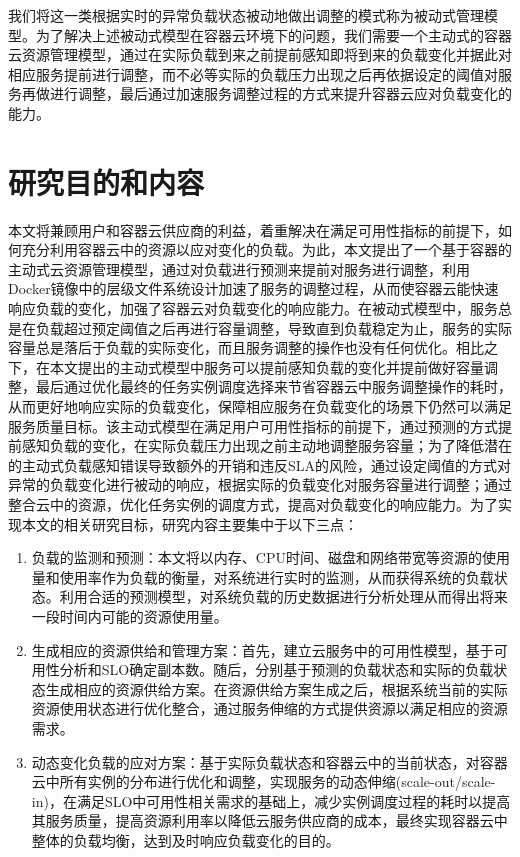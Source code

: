 我们将这一类根据实时的异常负载状态被动地做出调整的模式称为被动式管理模型。为了解决上述被动式模型在容器云环境下的问题，我们需要一个主动式的容器云资源管理模型，通过在实际负载到来之前提前感知即将到来的负载变化并据此对相应服务提前进行调整，而不必等实际的负载压力出现之后再依据设定的阈值对服务再做进行调整，最后通过加速服务调整过程的方式来提升容器云应对负载变化的能力。

\section{研究目的和内容}
本文将兼顾用户和容器云供应商的利益，着重解决在满足可用性指标的前提下，如何充分利用容器云中的资源以应对变化的负载。为此，本文提出了一个基于容器的主动式云资源管理模型，通过对负载进行预测来提前对服务进行调整，利用Docker镜像中的层级文件系统设计加速了服务的调整过程，从而使容器云能快速响应负载的变化，加强了容器云对负载变化的响应能力。在被动式模型中，服务总是在负载超过预定阈值之后再进行容量调整，导致直到负载稳定为止，服务的实际容量总是落后于负载的实际变化，而且服务调整的操作也没有任何优化。相比之下，在本文提出的主动式模型中服务可以提前感知负载的变化并提前做好容量调整，最后通过优化最终的任务实例调度选择来节省容器云中服务调整操作的耗时，从而更好地响应实际的负载变化，保障相应服务在负载变化的场景下仍然可以满足服务质量目标。该主动式模型在满足用户可用性指标的前提下，通过预测的方式提前感知负载的变化，在实际负载压力出现之前主动地调整服务容量；为了降低潜在的主动式负载感知错误导致额外的开销和违反SLA的风险，通过设定阈值的方式对异常的负载变化进行被动的响应，根据实际的负载变化对服务容量进行调整；通过整合云中的资源，优化任务实例的调度方式，提高对负载变化的响应能力。为了实现本文的相关研究目标，研究内容主要集中于以下三点：
\begin{enumerate}
\item 负载的监测和预测：本文将以内存、CPU时间、磁盘和网络带宽等资源的使用量和使用率作为负载的衡量，对系统进行实时的监测，从而获得系统的负载状态。利用合适的预测模型，对系统负载的历史数据进行分析处理从而得出将来一段时间内可能的资源使用量。
\item 生成相应的资源供给和管理方案：首先，建立云服务中的可用性模型，基于可用性分析和SLO确定副本数。随后，分别基于预测的负载状态和实际的负载状态生成相应的资源供给方案。在资源供给方案生成之后，根据系统当前的实际资源使用状态进行优化整合，通过服务伸缩的方式提供资源以满足相应的资源需求。
\item 动态变化负载的应对方案：基于实际负载状态和容器云中的当前状态，对容器云中所有实例的分布进行优化和调整，实现服务的动态伸缩(scale-out/scale-in)，在满足SLO中可用性相关需求的基础上，减少实例调度过程的耗时以提高其服务质量，提高资源利用率以降低云服务供应商的成本，最终实现容器云中整体的负载均衡，达到及时响应负载变化的目的。
\end{enumerate}

